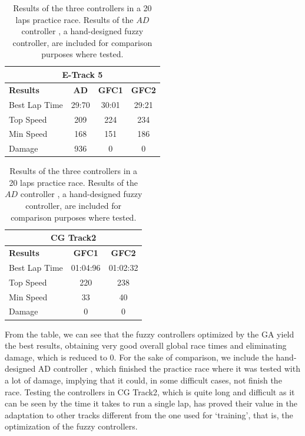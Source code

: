 \documentclass[conference]{IEEEtran}
\begin{document}
\begin{table}[!ht]
	\centering
	{\scriptsize
		\caption{Results of the three controllers in a 20 laps
			practice race. Results of the $AD$ controller
			\cite{evo17}, a hand-designed fuzzy controller, are
			included for comparison purposes where tested.}
		\label{resultat20}
		\begin{tabular}{|p{3cm}|c|c|c|}
			\hline
			\multicolumn{4}{|c|}{\textbf{E-Track 5}}  \\
			\hline \textbf{Results} & \textbf{AD} & \textbf{GFC1} & \textbf{GFC2}\\
			\hline Best Lap Time         & 29:70 & 30:01 & 29:21 \\
			\hline Top Speed          & 209 & 224 & 234\\
			\hline Min Speed          & 168 & 151 & 186 \\
			\hline Damage          & 936 & 0 & 0\\
			\hline
		\end{tabular}
		\begin{tabular}{|p{3cm}|c|c|}
			\hline
			\multicolumn{3}{|c|}{\textbf{CG Track2}}  \\ 
			\hline \textbf{Results} & \textbf{GFC1} & \textbf{GFC2}  \\
			\hline Best Lap Time         &       01:04:96     & 01:02:32  \\
			\hline Top Speed &220  &  238 \\
			\hline Min Speed               & 33             & 40  \\
			\hline Damage                    & 0              & 0  \\
			\hline 
		\end{tabular}
	}
\end{table} %

From the table, we can see that the fuzzy controllers optimized by the
GA yield the best results, obtaining very good overall global race
times and eliminating damage, which is reduced to 0. For the sake of
comparison, we include the hand-designed AD controller \cite{evo17},
which finished the practice race where it was tested with a lot of
damage, implying that it could, in some difficult cases, not finish
the race. 
Testing the controllers in CG Track2, which is quite long and
difficult as it can be seen by the time it takes to run a single lap,
has proved their value in the adaptation to other tracks different
from the one used for `training', that is, the optimization of the
fuzzy controllers. 
\end{document}
